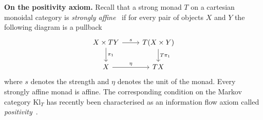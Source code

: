 \documentclass[a4paper,UKenglish,numberwithinsect,cleveref, autoref, thm-restate]{lipics-v2021}
\theoremstyle{plain} %
\newtheorem{myproposition}[mytheorem]{Proposition}
\theoremstyle{definition} %
\begin{document}
% 
% 
%  

\textbf{On the positivity axiom.}
Recall that a strong monad $T$ on a cartesian monoidal category is \emph{strongly affine}~\cite{Jacobs16} if for every pair of objects $X$ and $Y$ the following diagram is a pullback
 \[
  \begin{tikzcd}
   X \times TY \ar{d}{\pi_1} \ar{r}{s} & T(X\times Y) \ar{d}{T\pi_1} \\
   X \ar{r}{\eta} & TX
  \end{tikzcd}
 \]
where $s$ denotes the strength and $\eta$ denotes the unit of the monad. Every strongly affine monad is affine. 
The corresponding condition on the Markov category $\mathrm{Kl}_T$ has recently been characterised as an information flow axiom called \emph{positivity}~\cite[Section~2]{fritz2022dilations}.
\end{document}
